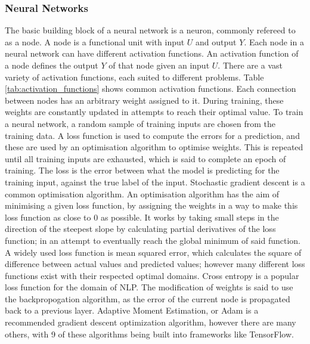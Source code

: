 \documentclass[11pt]{article}
\begin{document}
\subsubsection{Neural Networks}
The basic building block of a neural network is a neuron, commonly refereed to as a node. A node is a functional unit with input $U$ and output $Y$. Each node in a neural network can have different activation functions.
An activation function of a node defines the output $Y$ of that node given an input $U$. There are a vast variety of activation functions, each suited to different problems. Table \ref{tab:activation_functions} shows common activation functions.
Each connection between nodes has an arbitrary weight assigned to it. During training, these weights are constantly updated in attempts to reach their optimal value. 
\newline\newline
To train a neural network, a random sample of training inputs are chosen from the training data. A loss function is used to compute the errors for a prediction, and these are used by an optimisation algorithm to optimise weights. This is repeated until all training inputs are exhausted, which is said to complete an epoch of training. 
\newline 
The loss is the error between what the model is predicting for the training input, against the true label of the input. Stochastic gradient descent is a common optimisation algorithm. An optimisation algorithm has the aim of minimising a given loss function, by assigning the weights in a way to make this loss function as close to 0 as possible. It works by taking small steps in the direction of the steepest slope by calculating partial derivatives of the loss function; in an attempt to eventually reach the global minimum of said function. 
\textcolor{cite}{\citet{neuralnetworks}} 
\newline\newline
A widely used loss function is mean squared error, which calculates the square of difference between actual values and predicted values; however many different loss functions exist with their respected optimal domains. Cross entropy is a popular loss function for the domain of NLP. The modification of weights is said to use the backpropogation algorithm, as the error of the current node is propagated back to a previous layer.
\newline\newline
Adaptive Moment Estimation, or Adam is a recommended gradient descent optimization algorithm, however there are many others, with 9 of these algorithms being built into frameworks like TensorFlow.    
\end{document}
